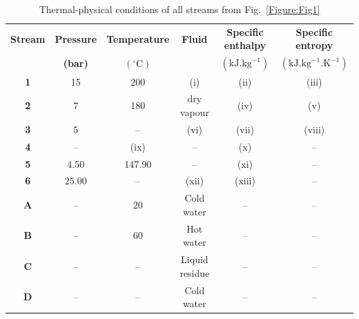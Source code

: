 \documentclass[calculator,allquestions,datasheet,solutions]{exam_newMarcus2}
\begin{document}
\begin{question}
      \begin{table}[h]
        \begin{center}
          \begin{tabular}{||c|c|c|c|c|c||}
            \hline\hline
                {\bf Stream} & {\bf Pressure} & {\bf Temperature} & {\bf Fluid} & {\bf Specific enthalpy} & {\bf Specific entropy} \\
                             & {\bf (bar)}    & {\bf $\left(^{\circ}\text{C}\right)$}& &  {\bf $\left(\text{kJ.kg}^{-1}\right)$} & {\bf $\left(\text{kJ.kg}^{-1}\text{.K}^{-1}\right)$} \\  
            \hline\hline
                {\bf 1}      &   15           &   200              & (i)        &  (ii)                   &   (iii)                  \\
            \hline
                {\bf 2}      &   7            &   180              & dry vapour &   (iv)                  &   (v)                     \\ 
            \hline
                {\bf 3}      &   5            &   --               & (vi)       &   (vii)                 &    (viii)                 \\
            \hline
                {\bf 4}      &   --           &   (ix)             & --        &    (x)                   &    --                     \\
            \hline
                {\bf 5}      &   4.50         &   147.90           & --        &    (xi)                  &    --                     \\
            \hline
                {\bf 6}      &   25.00        &   --               & (xii)      &    (xiii)               &    --                     \\
            \hline
                {\bf A}      &   --           &   20               & Cold water  &   --                   &    --                     \\
            \hline
                {\bf B}      &   --           &   60               & Hot water  &   --                   &    --                     \\
            \hline
                {\bf C}      &   --           &   --               & Liquid residue&   --                   &    --                     \\
            \hline
                {\bf D}      &   --           &   --               & Cold water  &   --                   &    --                     \\
            \hline\hline
          \end{tabular}
           \caption{Thermal-physical​ conditions​ ​of​ all​ streams​ ​from​ ​Fig.​~\ref{Figure:Fig1}}\label{Table:Tab1}
        \end{center}
      \end{table}


\end{question}
\end{document}
